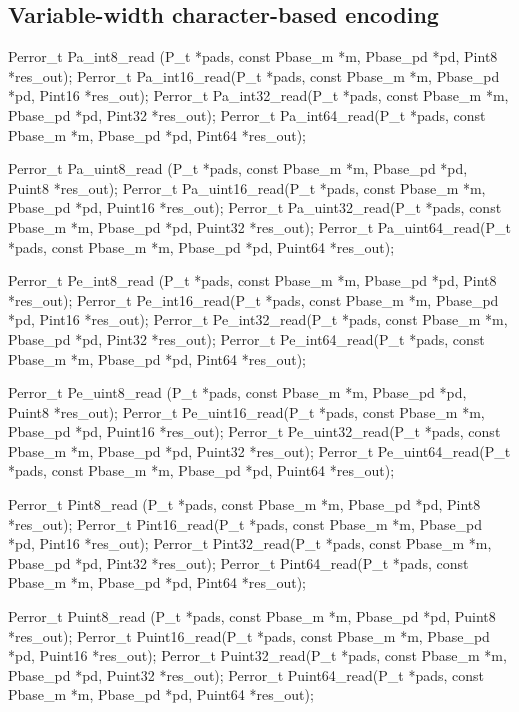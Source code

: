 \subsection{Variable-width character-based encoding}

\aedBegin{}
\aedEnd{}

\begin{tinycodeaux}{\leftmargin=0in}
\codeallowbreaks
Perror_t Pa_int8_read (P_t *pads, const Pbase_m *m,
		       Pbase_pd *pd, Pint8 *res_out);
Perror_t Pa_int16_read(P_t *pads, const Pbase_m *m,
		       Pbase_pd *pd, Pint16 *res_out);
Perror_t Pa_int32_read(P_t *pads, const Pbase_m *m,
		       Pbase_pd *pd, Pint32 *res_out);
Perror_t Pa_int64_read(P_t *pads, const Pbase_m *m,
		       Pbase_pd *pd, Pint64 *res_out);

Perror_t Pa_uint8_read (P_t *pads, const Pbase_m *m,
			Pbase_pd *pd, Puint8 *res_out);
Perror_t Pa_uint16_read(P_t *pads, const Pbase_m *m,
			Pbase_pd *pd, Puint16 *res_out);
Perror_t Pa_uint32_read(P_t *pads, const Pbase_m *m,
			Pbase_pd *pd, Puint32 *res_out);
Perror_t Pa_uint64_read(P_t *pads, const Pbase_m *m,
			Pbase_pd *pd, Puint64 *res_out);

Perror_t Pe_int8_read (P_t *pads, const Pbase_m *m,
		       Pbase_pd *pd, Pint8 *res_out);
Perror_t Pe_int16_read(P_t *pads, const Pbase_m *m,
		       Pbase_pd *pd, Pint16 *res_out);
Perror_t Pe_int32_read(P_t *pads, const Pbase_m *m,
		       Pbase_pd *pd, Pint32 *res_out);
Perror_t Pe_int64_read(P_t *pads, const Pbase_m *m,
		       Pbase_pd *pd, Pint64 *res_out);

Perror_t Pe_uint8_read (P_t *pads, const Pbase_m *m,
			Pbase_pd *pd, Puint8 *res_out);
Perror_t Pe_uint16_read(P_t *pads, const Pbase_m *m,
			Pbase_pd *pd, Puint16 *res_out);
Perror_t Pe_uint32_read(P_t *pads, const Pbase_m *m,
			Pbase_pd *pd, Puint32 *res_out);
Perror_t Pe_uint64_read(P_t *pads, const Pbase_m *m,
			Pbase_pd *pd, Puint64 *res_out);

Perror_t Pint8_read (P_t *pads, const Pbase_m *m,
		     Pbase_pd *pd, Pint8 *res_out);
Perror_t Pint16_read(P_t *pads, const Pbase_m *m,
		     Pbase_pd *pd, Pint16 *res_out);
Perror_t Pint32_read(P_t *pads, const Pbase_m *m,
		     Pbase_pd *pd, Pint32 *res_out);
Perror_t Pint64_read(P_t *pads, const Pbase_m *m,
		     Pbase_pd *pd, Pint64 *res_out);

Perror_t Puint8_read (P_t *pads, const Pbase_m *m,
		      Pbase_pd *pd, Puint8 *res_out);
Perror_t Puint16_read(P_t *pads, const Pbase_m *m,
		      Pbase_pd *pd, Puint16 *res_out);
Perror_t Puint32_read(P_t *pads, const Pbase_m *m,
		      Pbase_pd *pd, Puint32 *res_out);
Perror_t Puint64_read(P_t *pads, const Pbase_m *m,
		      Pbase_pd *pd, Puint64 *res_out);
\end{tinycodeaux}


